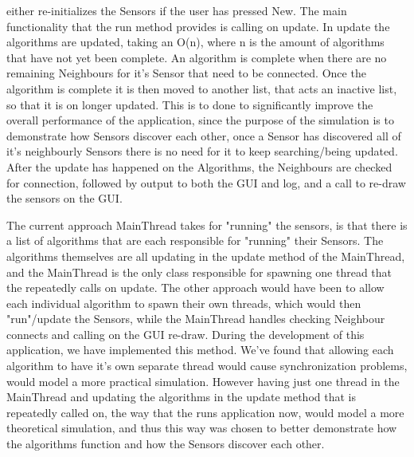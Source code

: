 either re-initializes the Sensors if the user has pressed New. The main 
functionality that the run method provides is calling on update. In update the 
algorithms are updated, taking an O(n), where n is the amount of algorithms that 
have not yet been complete. An algorithm is complete when there are no remaining 
Neighbours for it's Sensor that need to be connected. Once the algorithm is 
complete it is then moved to another list, that acts an inactive list, so that it 
is on longer updated. This is to done to significantly improve the overall 
performance of the application, since the purpose of the simulation is to 
demonstrate how Sensors discover each other, once a Sensor has discovered all of 
it's neighbourly Sensors there is no need for it to keep searching/being updated. 
After the update has happened on the Algorithms, the Neighbours are checked for 
connection, followed by output to both the GUI and log, and a call to re-draw the 
sensors on the GUI. 

The current approach MainThread takes for "running" the sensors, is that there is a list of algorithms that are each responsible for "running" their Sensors. The algorithms themselves are all updating in the update method of the MainThread, and the MainThread is the only class responsible for spawning one thread that the repeatedly calls on update. The other approach would have been to allow each individual algorithm to spawn their own threads, which would then "run"/update the Sensors, while the MainThread handles checking Neighbour connects and calling on the GUI re-draw. During the development of this application, we have implemented this method. We've found that allowing each algorithm to have it's own separate thread would cause synchronization problems, would model a more practical simulation. However having just one thread in the MainThread and updating the algorithms in the update method that is repeatedly called on, the way that the runs application now, would model a more theoretical simulation, and thus this way was chosen to better demonstrate how the algorithms function and how the Sensors discover each other.